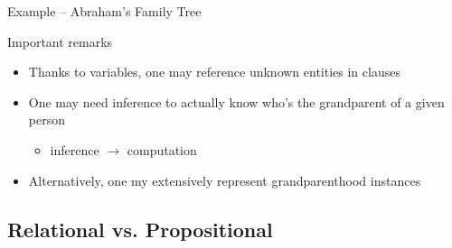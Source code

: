 \documentclass[presentation]{beamer}\mode<presentation>{\usetheme{AMSBolognaFC}}
\begin{document}
\begin{frame}[allowframebreaks]{Example -- Abraham's Family Tree}
    \begin{alertblock}{Important remarks}
        \begin{itemize}
            \item Thanks to \alert{variables}, one may reference unknown entities in clauses
            \item One may need \alert{inference} to actually know who's the grandparent of a given person
            \begin{itemize}
                \item inference $\rightarrow$ computation
            \end{itemize}
            \item Alternatively, one my \alert{extensively} represent grandparenthood instances
        \end{itemize}
    \end{alertblock}
\end{frame}

\subsection{Relational vs. Propositional}
\end{document}
